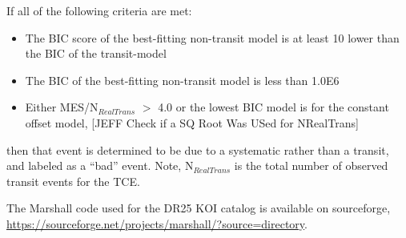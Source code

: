 


If all of the following criteria are met:

\begin{itemize}
\item The BIC score of the best-fitting non-transit model is at least 10 lower than the BIC of the transit-model
\item The BIC of the best-fitting non-transit model is less than 1.0E6
\item Either MES/N$_{RealTrans}$ $>$ 4.0 or the lowest BIC model is for the constant offset model, [JEFF Check if a SQ Root Was USed for NRealTrans]
\end{itemize}

\noindent then that event is determined to be due to a systematic rather than a transit, and labeled as a ``bad'' event. Note, N$_{RealTrans}$ is the total number of observed transit events for the TCE.

The Marshall code used for the DR25 KOI catalog is available on sourceforge, \url{https://sourceforge.net/projects/marshall/?source=directory}.


